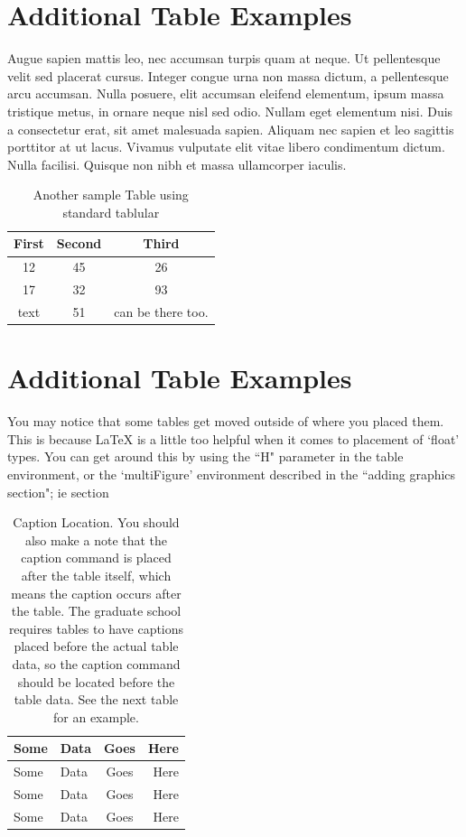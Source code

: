 \documentclass[../main.tex]{subfiles}
\begin{document}
\section{Additional Table Examples}
Augue sapien mattis leo, nec accumsan turpis quam at neque. Ut pellentesque velit sed placerat cursus. Integer congue urna non massa dictum, a pellentesque arcu accumsan. Nulla posuere, elit accumsan eleifend elementum, ipsum massa tristique metus, in ornare neque nisl sed odio. Nullam eget elementum nisi. Duis a consectetur erat, sit amet malesuada sapien. Aliquam nec sapien et leo sagittis porttitor at ut lacus. Vivamus vulputate elit vitae libero condimentum dictum. Nulla facilisi. Quisque non nibh et massa ullamcorper iaculis.

 \begin{table}[htbp]
    \caption{Another sample Table using standard tablular}\label{sttab}
    \begin{tabular}{c c c}
      \hline
      First & Second & Third \\
      \hline
      12 & 45 & 26 \\
      17 & 32 & 93 \\
      text & 51 & can be there too. \\	
      \hline
    \end{tabular}
\end{table}

\section{Additional Table Examples}
You may notice that some tables get moved outside of where you placed them. This is because \LaTeX{} is a little too helpful when it comes to placement of `float' types. You can get around this by using the ``H" parameter in the table environment, or the `multiFigure' environment described in the ``adding graphics section"; ie section %

\begin{table}[H]
\caption[Caption Location]{ Caption Location. You should also make a note that the caption command is placed after the table itself, which means the caption occurs after the table. The graduate school requires tables to have captions placed {before} the actual table data, so the caption command should be located before the table data. See the next table for an example.}
\begin{tabular}{llcr}
\hline
Some    & Data  & Goes  & Here\\
\hline
Some    & Data  & Goes  & Here\\
Some    & Data  & Goes  & Here\\
Some    & Data  & Goes  & Here\\
\hline
\end{tabular}

\end{table}
\end{document}
